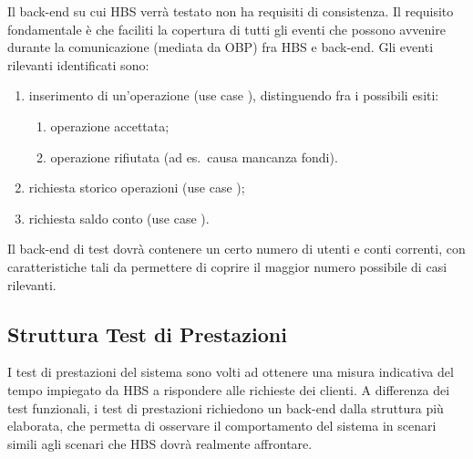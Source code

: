 Il back-end su cui HBS verr\`a testato non ha requisiti di consistenza.
Il requisito fondamentale \`e che faciliti la copertura di tutti gli eventi che possono avvenire durante la comunicazione (mediata da OBP) fra HBS e back-end.
Gli eventi rilevanti identificati sono:
\begin{enumerate}
	\item inserimento di un'operazione (use case \iducDISPAG), distinguendo fra i possibili esiti:
		\begin{enumerate}
			\item operazione accettata;
			\item operazione rifiutata (ad es.\ causa mancanza fondi).
		\end{enumerate}
	\item richiesta storico operazioni (use case \iducVERSTOR);
	\item richiesta saldo conto (use case \iducVERSAL).
\end{enumerate}

Il back-end di test dovr\`a contenere un certo numero di utenti e conti correnti, con caratteristiche tali da permettere di coprire il maggior numero possibile di casi rilevanti.

\subsection{Struttura Test di Prestazioni}

I test di prestazioni del sistema sono volti ad ottenere una misura indicativa del tempo impiegato da HBS a rispondere alle richieste dei clienti.
A differenza dei test funzionali, i test di prestazioni richiedono un back-end dalla struttura pi\`u elaborata, che permetta di osservare il comportamento del sistema in scenari simili agli scenari che HBS dovr\`a realmente affrontare.

